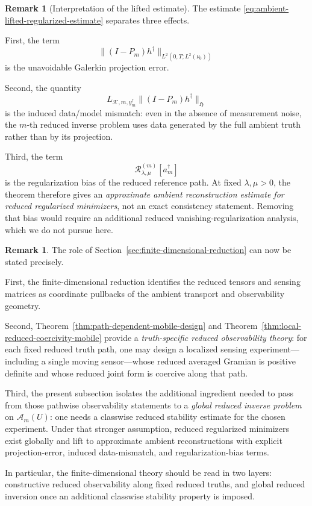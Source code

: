 \documentclass{article}
\theoremstyle{definition}
\newtheorem{remark}[theorem]{Remark}
\begin{document}
\begin{remark}[Interpretation of the lifted estimate]
    \label{rem:ambient-lifted-estimate-interpretation}
    The estimate \eqref{eq:ambient-lifted-regularized-estimate} separates three effects.

    First, the term
    \[
        \|(I-P_m)h^\dagger\|_{L^2(0,T;L^2(\nu_0))}
    \]
    is the unavoidable Galerkin projection error.

    Second, the quantity
    \[
        L_{\mathcal K,m,y_m^\dagger}\|(I-P_m)h^\dagger\|_{\mathfrak H}
    \]
    is the induced data/model mismatch: even in the absence of measurement noise, the \(m\)-th
    reduced inverse problem uses data generated by the full ambient truth rather than by its
    projection.

    Third, the term
    \[
        \mathcal R_{\lambda,\mu}^{(m)}[a_m^\dagger]
    \]
    is the regularization bias of the reduced reference path. At fixed \(\lambda,\mu>0\), the theorem
    therefore gives an \emph{approximate ambient reconstruction estimate for reduced regularized
        minimizers}, not an exact consistency statement. Removing that bias would require an additional
    reduced vanishing-regularization analysis, which we do not pursue here.
\end{remark}

\begin{remark}
    \label{rem:ambient-approximate-recovery-section5}
    The role of Section~\ref{sec:finite-dimensional-reduction} can now be stated precisely.

    First, the finite-dimensional reduction identifies the reduced tensors and sensing matrices as
    coordinate pullbacks of the ambient transport and observability geometry.

    Second, Theorem~\ref{thm:path-dependent-mobile-design} and
    Theorem~\ref{thm:local-reduced-coercivity-mobile} provide a \emph{truth-specific reduced
    observability theory}: for each fixed reduced truth path, one may design a localized sensing
    experiment---including a single moving sensor---whose reduced averaged Gramian is positive
    definite and whose reduced joint form is coercive along that path.

    Third, the present subsection isolates the additional ingredient needed to pass from those
    pathwise observability statements to a \emph{global reduced inverse problem} on
    \(\mathcal A_m(U)\): one needs a classwise reduced stability estimate for the chosen experiment.
    Under that stronger assumption, reduced regularized minimizers exist globally and lift to
    approximate ambient reconstructions with explicit projection-error, induced data-mismatch, and
    regularization-bias terms.

    In particular, the finite-dimensional theory should be read in two layers: constructive reduced
    observability along fixed reduced truths, and global reduced inversion once an additional
    classwise stability property is imposed.
\end{remark}




\end{document}
